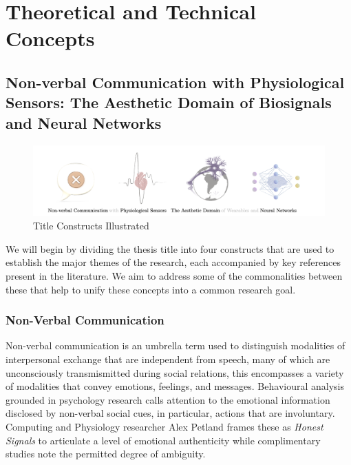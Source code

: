 

\chapter{Theoretical and Technical Concepts}
\label{cha:technical_concepts}

\section{Non-verbal Communication with Physiological Sensors: The Aesthetic Domain of Biosignals and Neural Networks}
\label{sec:title_constructs}

\begin{figure}[htbp]
	\centering
	\includegraphics[width=\textwidth]{Chapters/Figures/background/sec2_title_constructs_alpha_2.png}
	\caption{Title Constructs Illustrated}
	\label{fig:Title_Constructs}
\end{figure}

We will begin by dividing the thesis title into four constructs that are used to establish the major themes of the research, each accompanied by key references present in the literature. We aim to address some of the commonalities between these that help to unify these concepts into a common research goal.

\subsection{Non-Verbal Communication}

Non-verbal communication is an umbrella term used to distinguish modalities of interpersonal exchange that are independent from speech, many of which are unconsciously transmismitted during social relations, this encompasses a variety of modalities that convey emotions, feelings, and messages. Behavioural analysis grounded in psychology research calls attention to the emotional information disclosed by non-verbal social cues, in particular, actions that are involuntary. Computing and Physiology researcher Alex Petland frames these as \textit{Honest Signals} to articulate a level of emotional authenticity while complimentary studies note the permitted degree of ambiguity.

